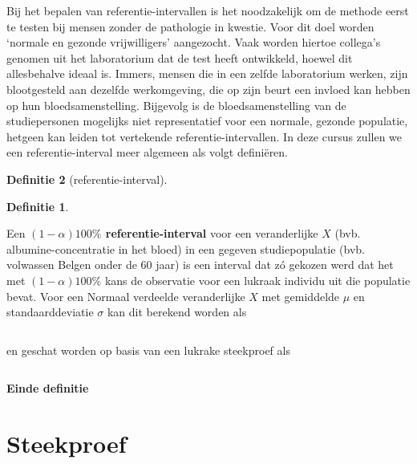 \documentclass[
  12pt,dutch,coursenotes]{book}
\theoremstyle{definition}
\newtheorem{definition}{Definitie}[chapter]
\theoremstyle{definition}
\theoremstyle{definition}
\theoremstyle{remark}
\begin{document}
Bij het bepalen van referentie-intervallen is het noodzakelijk om de methode
eerst te testen bij mensen zonder de pathologie in kwestie. Voor dit doel
worden `normale en gezonde vrijwilligers' aangezocht. Vaak worden hiertoe
collega's genomen uit het laboratorium dat de test heeft ontwikkeld, hoewel
dit allesbehalve ideaal is. Immers, mensen die in een zelfde laboratorium
werken, zijn blootgesteld aan dezelfde werkomgeving, die op zijn beurt een
invloed kan hebben op hun bloedsamenstelling. Bijgevolg is de
bloedsamenstelling van de studiepersonen mogelijks niet representatief voor
een normale, gezonde populatie, hetgeen kan leiden tot vertekende
referentie-intervallen. In deze cursus zullen we een referentie-interval
meer algemeen als volgt definiëren.

\begin{definition}[referentie-interval]
\begin{definition}

\protect\hypertarget{def:unnamed-chunk-44}{}{\label{def:unnamed-chunk-44} \iffalse (referentie-interval) \fi{} }

\end{definition}
\end{definition}

Een \textbf{\((1-\alpha)100\%\) referentie-interval}
voor een veranderlijke \(X\) (bvb. albumine-concentratie
in het bloed) in een gegeven studiepopulatie (bvb. volwassen Belgen onder de
60 jaar) is een interval dat zó gekozen werd dat het met \((1-\alpha)100\%\)
kans de observatie voor een lukraak individu uit die populatie bevat. Voor
een Normaal verdeelde veranderlijke \(X\) met gemiddelde \(\mu\) en
standaarddeviatie \(\sigma\) kan dit berekend worden als

\begin{equation*}
[\mu-z_{\alpha/2}\sigma,\mu+z_{\alpha/2}\sigma]
\end{equation*}

en geschat worden op basis van een lukrake steekproef als

\begin{equation*}
[\bar x-z_{\alpha/2}s_x,\bar x+z_{\alpha/2}s_x]
\end{equation*}

\textbf{Einde definitie}

\hypertarget{steekproef}{%
\section{Steekproef}\label{steekproef}}
\end{document}
